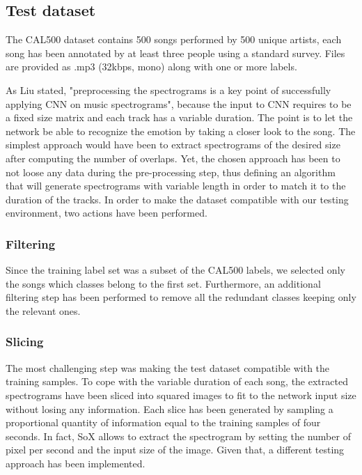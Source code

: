 \documentclass[10pt,twocolumn,letterpaper]{article}
\begin{document}
\subsection{Test dataset}

The CAL500 dataset contains 500 songs performed by 500 unique artists, each song has been annotated by at least three people using a standard survey. Files are provided as .mp3 (32kbps, mono) along with one or more labels.

As Liu \etal \cite{Liu} stated, "preprocessing the spectrograms is a key point of successfully applying CNN on music spectrograms", because the input to CNN requires to be a fixed size matrix and each track has a variable duration. The point is to let the network be able to recognize the emotion by taking a closer look to the song. The simplest approach would have been to extract spectrograms of the desired size after computing the number of overlaps. Yet, the chosen approach has been to not loose any data during the pre-processing step, thus defining an algorithm that will generate spectrograms with variable length in order to match it to the duration of the tracks.
In order to make the dataset compatible with our testing environment, two actions have been performed.

\subsubsection{Filtering}

Since the training label set was a subset of the CAL500 labels, we selected only the songs which classes belong to the first set. Furthermore, an additional filtering step has been performed to remove all the redundant classes keeping only the relevant ones.

\subsubsection{Slicing}

The most challenging step was making the test dataset compatible with the training samples. To cope with the variable duration of each song, the extracted spectrograms have been sliced into squared images to fit to the network input size without losing any information. Each slice has been generated by sampling a proportional quantity of information equal to the training samples of four seconds. In fact, SoX allows to extract the spectrogram by setting the number of pixel per second and the input size of the image. Given that, a different testing approach has been implemented.
\end{document}
